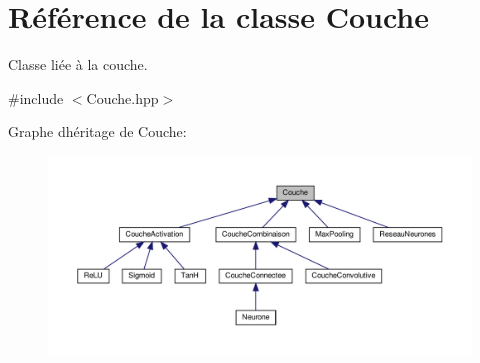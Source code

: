 \hypertarget{class_couche}{}\section{Référence de la classe Couche}
\label{class_couche}


Classe liée à la couche.  




{\ttfamily \#include $<$Couche.\+hpp$>$}



Graphe d\textquotesingle{}héritage de Couche\+:\nopagebreak
\begin{figure}[H]
\begin{center}
\leavevmode
\includegraphics[width=350pt]{class_couche__inherit__graph}
\end{center}
\end{figure}
